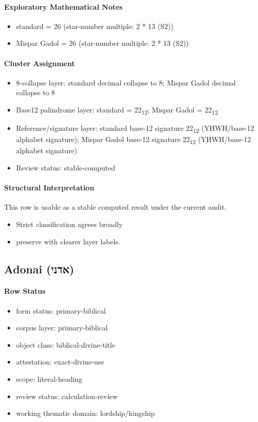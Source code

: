 \paragraph{Exploratory Mathematical Notes}
\begin{itemize}
\item standard = 26 (star-number multiple: 2 * 13 (S2))
\item Mispar Gadol = 26 (star-number multiple: 2 * 13 (S2))
\end{itemize}
\paragraph{Cluster Assignment}
\begin{itemize}
\item 8-collapse layer: standard decimal collapse to 8; Mispar Gadol decimal collapse to 8
\item Base12 palindrome layer: standard = 22\textsubscript{12}; Mispar Gadol = 22\textsubscript{12}
\item Reference/signature layer: standard base-12 signature 22\textsubscript{12} (YHWH/base-12 alphabet signature); Mispar Gadol base-12 signature 22\textsubscript{12} (YHWH/base-12 alphabet signature)
\item Review status: stable-computed
\end{itemize}
\paragraph{Structural Interpretation}
This row is usable as a stable computed result under the current audit.

\begin{itemize}
\item Strict classification agrees broadly
\item preserve with clearer layer labels.
\end{itemize}

\subsection{Adonai (אדני)}
\paragraph{Row Status}
\begin{itemize}
\item form status: primary-biblical
\item corpus layer: primary-biblical
\item object class: biblical-divine-title
\item attestation: exact-divine-use
\item scope: literal-heading
\item review status: calculation-review
\item working thematic domain: lordship/kingship
\end{itemize}
